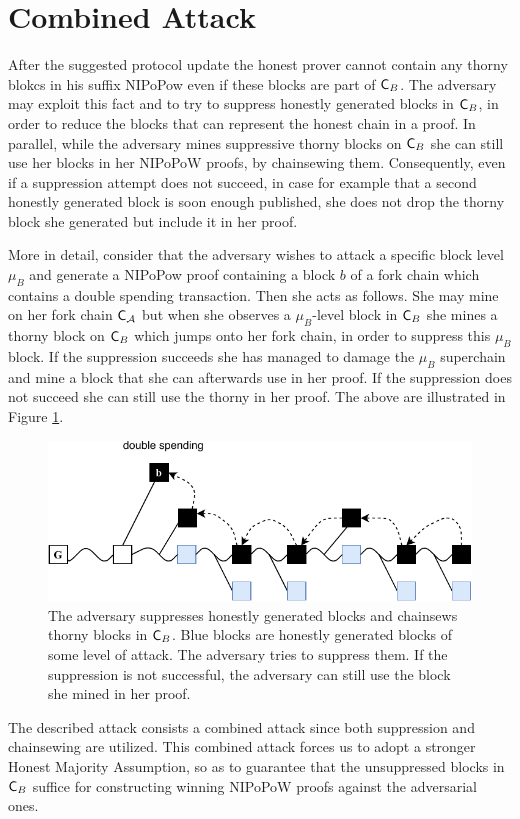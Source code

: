 \section{Combined Attack}
After the suggested protocol update the honest prover cannot contain any thorny blokcs in his suffix NIPoPow even if these blocks are part of $\mathsf{C}_B$.  The adversary may exploit this fact and to try to suppress honestly generated blocks in $\mathsf{C}_B$, in order to reduce the blocks that can represent the honest chain in a proof. In parallel, while the adversary mines suppressive thorny blocks on $\mathsf{C}_B$ she can still use her blocks in her NIPoPoW proofs, by chainsewing them. Consequently, even if a suppression attempt does not succeed, in case for example that a second honestly generated block is soon enough published, she does not drop the thorny block she generated but include it in her proof.

More in detail, consider that the adversary wishes to attack a specific block level $\mu_B$ and generate a NIPoPow proof containing a block $b$ of a fork chain which contains a double spending transaction. Then she acts as follows. She may mine on her fork chain $\mathsf{C}_\mathcal{A}$ but when she observes a $\mu_B$-level block in $\mathsf{C}_B$ she mines a thorny block on $\mathsf{C}_B$ which jumps onto her fork chain, in order to suppress this $\mu_B$ block. If the suppression succeeds she has managed to damage the $\mu_B$ superchain and mine a block that she can afterwards use in her proof. If the suppression does not succeed she can still use the thorny in her proof. The above are illustrated in Figure \ref{fig:attack_after_update}.

\begin{figure}[h!]
	\begin{center}
    \includegraphics[width=0.95\columnwidth]{figures/attack_after_update-crop.pdf}
	\end{center}
	\caption{The adversary suppresses honestly generated blocks and chainsews thorny blocks in $\mathsf{C}_B$. Blue blocks are honestly generated blocks of some level of attack. The adversary tries to suppress them. If the suppression is not successful, the adversary can still use the block she mined in her proof.}
	\label{fig:attack_after_update}
\end{figure}

The described attack consists a combined attack since both suppression and chainsewing are utilized. This combined attack forces us to adopt a stronger Honest Majority Assumption, so as to guarantee that the unsuppressed blocks in $\mathsf{C}_B$ suffice for constructing winning NIPoPoW proofs against the adversarial ones.
